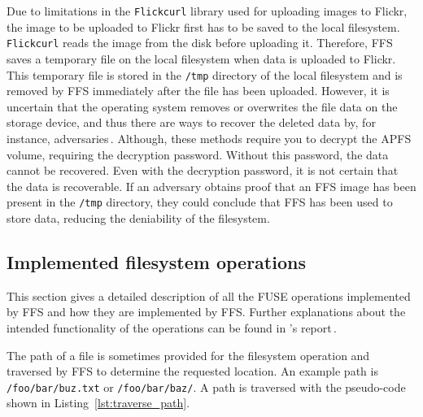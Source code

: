 Due to limitations in the \texttt{Flickcurl} library used for uploading images to Flickr, the image to be uploaded to Flickr first has to be saved to the local filesystem. \texttt{Flickcurl} reads the image from the disk before uploading it. Therefore, \gls{FFS} saves a temporary file on the local filesystem when data is uploaded to Flickr. This temporary file is stored in the \texttt{/tmp} directory of the local filesystem and is removed by \gls{FFS} immediately after the file has been uploaded. However, it is uncertain that the operating system removes or overwrites the file data on the storage device, and thus there are ways to recover the deleted data by, for instance, adversaries\,\cite{llcsysdevlaboratoriesHowRecoverData2022,cedricAPFSDataRecovery2022,santosHowRecoverData2021}. Although, these methods require you to decrypt the \gls{APFS} volume, requiring the decryption password. Without this password, the data cannot be recovered. Even with the decryption password, it is not certain that the data is recoverable. If an adversary obtains proof that an \gls{FFS} image has been present in the \texttt{/tmp} directory, they could conclude that \gls{FFS} has been used to store data, reducing the deniability of the filesystem.

\subsection{Implemented filesystem operations}
\label{subsec:file_op}
This section gives a detailed description of all the \gls{FUSE} operations implemented by \gls{FFS} and how they are implemented by \gls{FFS}. Further explanations about the intended functionality of the operations can be found in \citeauthor{kuenningCS135FUSEDocumentation2010}'s report\,\cite{kuenningCS135FUSEDocumentation2010}. 

The path of a file is sometimes provided for the filesystem operation and traversed by \gls{FFS} to determine the requested location. An example path is \texttt{/foo/bar/buz.txt} or \texttt{/foo/bar/baz/}. A path is traversed with the \mbox{pseudo-code} shown in Listing~\ref{lst:traverse_path}.


